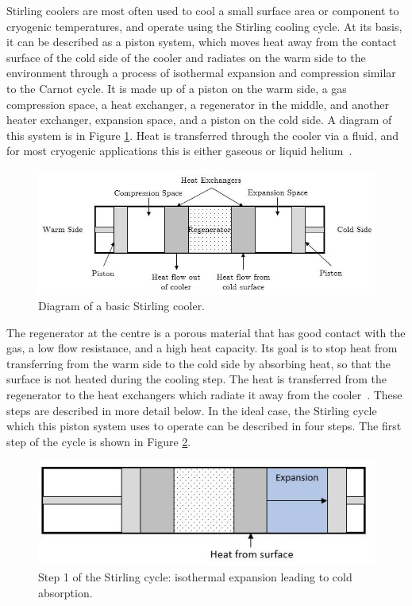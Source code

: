 Stirling coolers are most often used to cool a small surface area or component to cryogenic temperatures, and operate using the Stirling cooling cycle. At its basis, it can be described as a piston system, which moves heat away from the contact surface of the cold side of the cooler and radiates on the warm side to the environment through a process of isothermal expansion and compression similar to the Carnot cycle. It is made up of a piston on the warm side, a gas compression space, a heat exchanger, a regenerator in the middle, and another heater exchanger, expansion space, and a piston on the cold side. A diagram of this system is in Figure \ref{fig:stirling_cooler}. Heat is transferred through the cooler via a fluid, and for most cryogenic applications this is either gaseous or liquid helium~\citep{cryocoolers}.

\begin{figure}[h]
\centering
  \includegraphics[width=\linewidth]{chap2_images/stirling_cooler.JPG}
  \caption{Diagram of a basic Stirling cooler.}
  \label{fig:stirling_cooler}
\end{figure}

The regenerator at the centre is a porous material that has good contact with the gas, a low flow resistance, and a high heat capacity. Its goal is to stop heat from transferring from the warm side to the cold side by absorbing heat, so that the surface is not heated during the cooling step. The heat is transferred from the regenerator to the heat exchangers which radiate it away from the cooler~\citep{cryocoolers}. These steps are described in more detail below. In the ideal case, the Stirling cycle which this piston system uses to operate can be described in four steps. The first step of the cycle is shown in Figure \ref{fig:stirling_cycle_part_1}.

\begin{figure}[h]
\centering
  \includegraphics[width=0.8\linewidth]{chap2_images/stirling_process_cold_absorb.JPG}
  \caption{Step 1 of the Stirling cycle: isothermal expansion leading to cold absorption.}
  \label{fig:stirling_cycle_part_1}
\end{figure}

